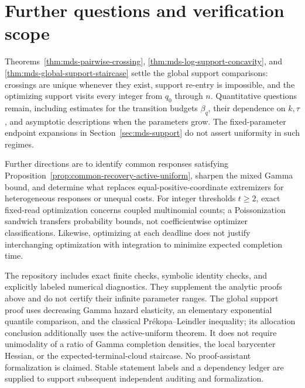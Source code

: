\documentclass[11pt]{article}
\theoremstyle{definition}
\theoremstyle{remark}
\newcommand{\1}{\mathbf 1}
\begin{document}
\section{Further questions and verification scope}
Theorems~\ref{thm:mds-pairwise-crossing},
\ref{thm:mds-log-support-concavity}, and
\ref{thm:mds-global-support-staircase} settle the global support
comparisons: crossings are unique whenever they exist, support
re-entry is impossible, and the optimizing support visits every
integer from \(q_0\) through \(n\). Quantitative questions remain,
including estimates for the transition budgets \(\beta_q\), their
dependence on \(k,\tau\), and asymptotic descriptions when the
parameters grow. The fixed-parameter endpoint expansions in
Section~\ref{sec:mds-support} do not assert uniformity in such regimes.

Further directions are to identify common responses satisfying
Proposition~\ref{prop:common-recovery-active-uniform}, sharpen the mixed
Gamma bound, and determine what replaces equal-positive-coordinate
extremizers for heterogeneous responses or unequal costs. For integer
thresholds \(t\ge2\), exact fixed-read optimization concerns coupled
multinomial counts; a Poissonization sandwich transfers probability
bounds, not coefficientwise optimizer classifications. Likewise,
optimizing at each deadline does not justify interchanging optimization
with integration to minimize expected completion time.

The repository includes exact finite checks, symbolic identity checks,
and explicitly labeled numerical diagnostics. They supplement the
analytic proofs above and do not certify their infinite parameter
ranges. The global support proof uses decreasing Gamma hazard
elasticity, an elementary exponential quantile comparison, and the
classical Pr\'ekopa--Leindler inequality; its allocation conclusion
additionally uses the active-uniform theorem. It does not require
unimodality of a ratio of Gamma completion densities, the local
barycenter Hessian, or the expected-terminal-cloud staircase.
No proof-assistant formalization is claimed. Stable statement labels
and a dependency ledger are supplied to support subsequent independent
auditing and formalization.
\end{document}

